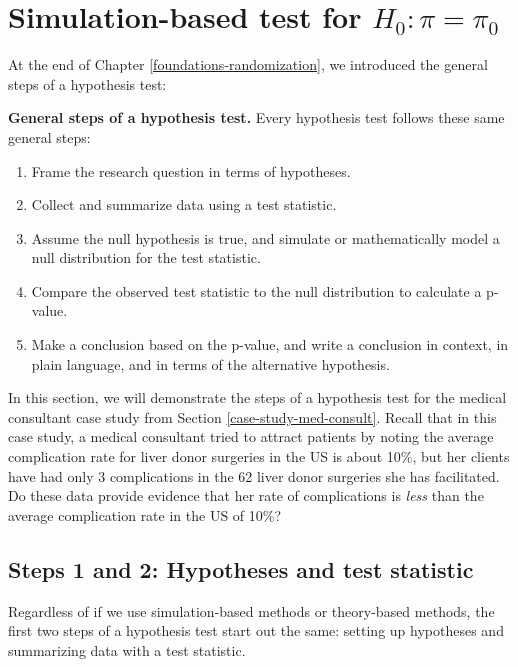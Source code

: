 \documentclass[
  10pt,
  openany]{book}
\providecommand{\tightlist}{%
  \setlength{\itemsep}{0pt}\setlength{\parskip}{0pt}}
\theoremstyle{definition}
\theoremstyle{definition}
\theoremstyle{definition}
\theoremstyle{definition}
\theoremstyle{remark}
\begin{document}
\section{\texorpdfstring{Simulation-based test for \(H_0: \pi = \pi_0\)}{Simulation-based test for H\_0: \textbackslash pi = \textbackslash pi\_0}}\label{one-prop-null-boot}

At the end of Chapter \ref{foundations-randomization}, we introduced the general steps of a hypothesis test:

\textbf{General steps of a hypothesis test.} Every hypothesis test follows these same general steps:

\begin{enumerate}
\def\labelenumi{\arabic{enumi}.}
\tightlist
\item
  Frame the research question in terms of hypotheses.
\item
  Collect and summarize data using a test statistic.
\item
  Assume the null hypothesis is true, and simulate or mathematically model a null distribution for the test statistic.
\item
  Compare the observed test statistic to the null distribution to calculate a p-value.
\item
  Make a conclusion based on the p-value, and write a conclusion in context, in plain language, and in terms of the alternative hypothesis.
\end{enumerate}

In this section, we will demonstrate the steps of a hypothesis test for the medical consultant case study from Section \ref{case-study-med-consult}.
Recall that in this case study, a medical consultant tried
to attract patients by noting the average complication rate for liver donor surgeries in the US is about 10\%, but her clients have had only 3 complications in the 62 liver donor surgeries she has facilitated.
Do these data provide evidence that her rate of complications is \emph{less} than the average complication rate in the US of 10\%?

\subsection*{Steps 1 and 2: Hypotheses and test statistic}\label{steps-1-and-2-hypotheses-and-test-statistic}

Regardless of if we use simulation-based methods or theory-based methods, the first two steps of a hypothesis test start out the same: setting up hypotheses and summarizing data with a test statistic.
\end{document}
